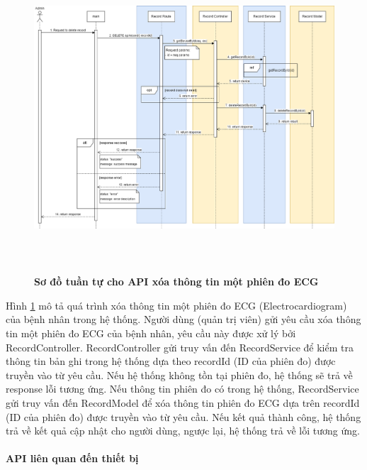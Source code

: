  \begin{figure}[H]
  \centering
  \includegraphics[width=16cm,height=11.5cm]{Images/sequence_api/deleteRecordById.png}
  \caption[Sơ đồ tuần tự cho API xóa thông tin một phiên đo ECG ]{\bfseries \fontsize{12pt}{0pt}
  \selectfont Sơ đồ tuần tự cho API xóa thông tin một phiên đo ECG }
  \label{api_deleteRecordById} %
\end{figure}
Hình \ref{api_deleteRecordById} mô tả quá trình xóa thông tin một phiên đo ECG (Electrocardiogram) của bệnh nhân trong hệ thống. Người dùng (quản trị viên) gửi yêu cầu xóa thông tin một phiên đo ECG của bệnh nhân,  
yêu cầu này được xử lý bởi RecordController. RecordController gửi truy vấn đến RecordService để kiểm tra thông tin bản ghi trong hệ thống dựa theo recordId (ID của phiên đo) được truyền vào từ yêu cầu. Nếu hệ thống không tồn tại phiên đo, hệ thống sẽ trả về response lỗi tương ứng. 
Nếu thông tin phiên đo có trong hệ thống, RecordService gửi truy vấn đến RecordModel để xóa thông tin phiên đo ECG dựa trên recordId (ID của phiên đo) được truyền vào từ yêu cầu. Nếu kết quả thành công, hệ thống trả về kết quả cập nhật cho người dùng, ngược lại, hệ thống trả về lỗi tương ứng.


\paragraph{API liên quan đến thiết bị}
\mbox{}

